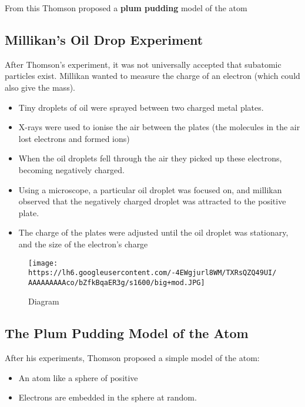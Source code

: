 From this Thomson proposed a \textbf{plum pudding} model of the atom

\hypertarget{millikans-oil-drop-experiment}{%
\subsection{Millikan's Oil Drop
Experiment}\label{millikans-oil-drop-experiment}}

After Thomson's experiment, it was not universally accepted that
subatomic particles exist. Millikan wanted to measure the charge of an
electron (which could also give the mass).

\begin{itemize}
\tightlist
\item
  Tiny droplets of oil were sprayed between two charged metal plates.
\item
  X-rays were used to ionise the air between the plates (the molecules
  in the air lost electrons and formed ions)
\item
  When the oil droplets fell through the air they picked up these
  electrons, becoming negatively charged.
\item
  Using a microscope, a particular oil droplet was focused on, and
  millikan observed that the negatively charged droplet was attracted to
  the positive plate.
\item
  The charge of the plates were adjusted until the oil droplet was
  stationary, and the size of the electron's charge
\end{itemize}

\begin{figure}
\centering
\texttt{[image: https://lh6.googleusercontent.com/-4EWgjurl8WM/TXRsQZQ49UI/AAAAAAAAAco/bZfkBqaER3g/s1600/big+mod.JPG]}
\caption{Diagram}
\end{figure}

\hypertarget{the-plum-pudding-model-of-the-atom}{%
\subsection{The Plum Pudding Model of the
Atom}\label{the-plum-pudding-model-of-the-atom}}

After his experiments, Thomson proposed a simple model of the atom:

\begin{itemize}
\tightlist
\item
  An atom like a sphere of positive
\item
  Electrons are embedded in the sphere at random.
\end{itemize}

